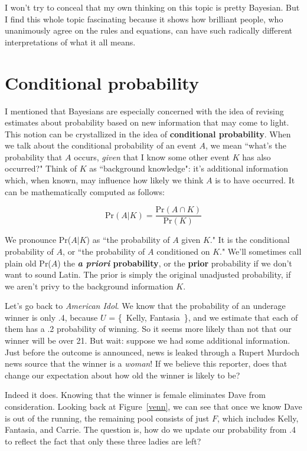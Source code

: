 I won't try to conceal that my own thinking on this topic is pretty
Bayesian. But I find this whole topic fascinating because it shows how
brilliant people, who unanimously agree on the rules and equations, can
have such radically different interpretations of what it all means.


\section{Conditional probability}

I mentioned that Bayesians are especially concerned with the idea of
revising estimates about probability based on new information that may come
to light. This notion can be crystallized in the idea of
\textbf{conditional probability}. When we talk about the conditional
probability of an event $A$, we mean ``what's the probability that $A$
occurs, \textit{given} that I know some other event $K$ has also occurred?"
Think of $K$ as ``background knowledge": it's additional information which,
when known, may influence how likely we think $A$ is to have occurred. It
can be mathematically computed as follows:

\[
\text{Pr}(A|K) = \dfrac{\text{Pr}(A \cap K)}{\text{Pr}(K)}
\]

We pronounce Pr($A|K$) as ``the probability of $A$ given $K$." It is the
conditional probability of $A$, or ``the probability of $A$ conditioned on
$K$." We'll sometimes call plain old Pr($A$) the \textbf{\textit{a priori}
probability}, or the \textbf{prior} probability if we don't want to sound
Latin. The prior is simply the original unadjusted probability, if we
aren't privy to the background information $K$.

Let's go back to \textit{American Idol}. We know that the probability of an
underage winner is only .4, because $U$ = \{~Kelly, Fantasia~\}, and we
estimate that each of them has a .2 probability of winning. So it seems
more likely than not that our winner will be over 21. But wait: suppose we
had some additional information. Just before the outcome is announced, news
is leaked through a Rupert Murdoch news source that the winner is a
\textit{woman}! If we believe this reporter, does that change our
expectation about how old the winner is likely to be?

Indeed it does. Knowing that the winner is female eliminates Dave from
consideration. Looking back at Figure~\ref{venn}, we can see that once we
know Dave is out of the running, the remaining pool consists of just $F$,
which includes Kelly, Fantasia, and Carrie. The question is, how do we
update our probability from .4 to reflect the fact that only these three
ladies are left?

